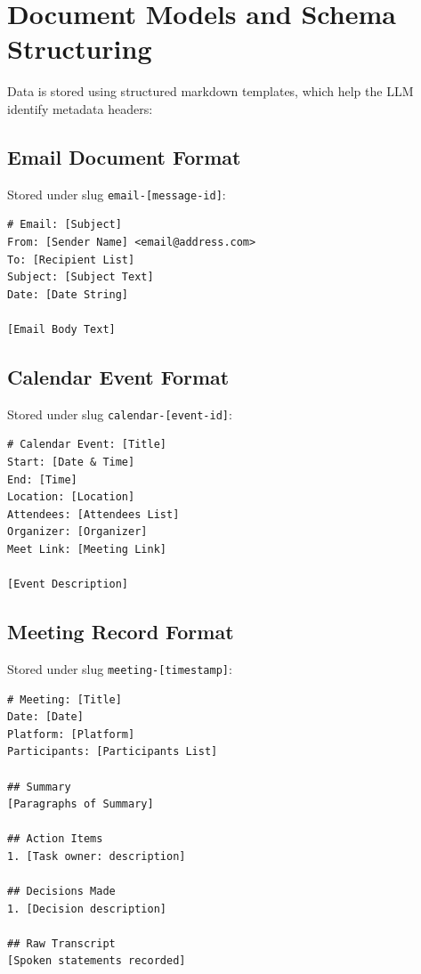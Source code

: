 \documentclass[12pt,a4paper]{report}
\begin{document}
\section{Document Models and Schema Structuring}
Data is stored using structured markdown templates, which help the LLM identify metadata headers:

\subsection{Email Document Format}
Stored under slug \texttt{email-[message-id]}:
\begin{lstlisting}[basicstyle=\ttfamily\scriptsize]
# Email: [Subject]
From: [Sender Name] <email@address.com>
To: [Recipient List]
Subject: [Subject Text]
Date: [Date String]

[Email Body Text]
\end{lstlisting}

\subsection{Calendar Event Format}
Stored under slug \texttt{calendar-[event-id]}:
\begin{lstlisting}[basicstyle=\ttfamily\scriptsize]
# Calendar Event: [Title]
Start: [Date & Time]
End: [Time]
Location: [Location]
Attendees: [Attendees List]
Organizer: [Organizer]
Meet Link: [Meeting Link]

[Event Description]
\end{lstlisting}

\subsection{Meeting Record Format}
Stored under slug \texttt{meeting-[timestamp]}:
\begin{lstlisting}[basicstyle=\ttfamily\scriptsize]
# Meeting: [Title]
Date: [Date]
Platform: [Platform]
Participants: [Participants List]

## Summary
[Paragraphs of Summary]

## Action Items
1. [Task owner: description]

## Decisions Made
1. [Decision description]

## Raw Transcript
[Spoken statements recorded]
\end{lstlisting}

\end{document}
